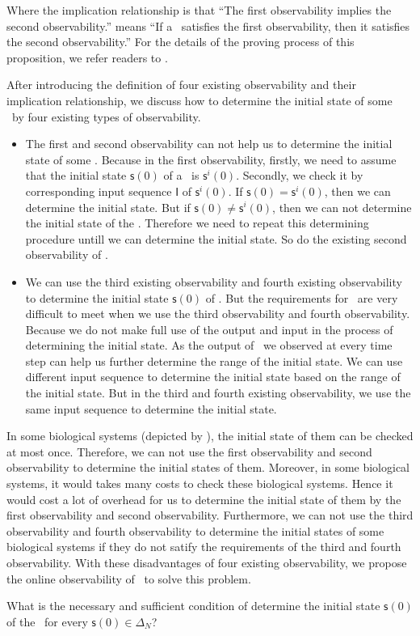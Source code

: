 Where the implication relationship is that ``The first observability implies the second observability.'' means ``If a \BCN\ satisfies the first observability, then it satisfies the second observability.'' For the details of the proving process of this proposition, we refer readers to \cite{Zhang2016Observability}.
   
After introducing the definition of four existing observability and their implication relationship, we discuss how to determine the initial state of some \BCNs\ by four existing types of observability. 
\begin{itemize}
\item The first and second observability can not help us to determine the initial state of some \BCNs. Because in the first observability, firstly, we need to assume that the initial state $\mathsf{s}(0)$ of a \BCN\ is $\mathsf{s}^{i}(0)$. Secondly, we check it by corresponding input sequence $\mathsf{I}$ of $\mathsf{s}^{i}(0)$. If $\mathsf{s}(0)=\mathsf{s}^{i}(0)$, then we can determine the initial state. But if $\mathsf{s}(0)\ne \mathsf{s}^{i}(0)$, then we can not determine the initial state of the \BCN. Therefore we need to repeat this determining procedure untill we can determine the initial state. %
So do the existing second observability of \BCNs.
\item We can use the third existing observability and fourth existing observability to determine the initial state $\mathsf{s}(0)$ of \BCNs. But the requirements for \BCNs\ are very difficult to meet when we use the third observability and fourth observability. Because we do not make full use of the output and input in the process of determining the initial state. As the output of \BCNs\ we observed at every time step can help us further determine the range of the initial state. We can use different input sequence to determine the initial state based on the range of the initial state. But in the third and fourth existing observability, we use the same input sequence to determine the initial state.
\end{itemize} 
 
In some biological systems (depicted by \BCNs), the initial state of them can be checked at most once. Therefore, we can not use the first observability and second observability to determine the initial states of them. Moreover, in some biological systems, it would takes many costs to check these biological systems. Hence it would cost a lot of overhead for us to determine the initial state of them by the first observability and second observability. Furthermore, we can not use the third observability and fourth observability to determine the initial states of some biological systems if they do not satify the requirements of the third and fourth observability. With these disadvantages of four existing observability, we propose the online observability of \BCNs\ to solve this problem.

 \begin{problem}
\label{pro:2}
What is the necessary and sufficient condition of determine the initial state $\mathsf{s}(0)$ of the \BCN\ for every $\mathsf{s}(0)\in\Delta_N$?
\end{problem}
